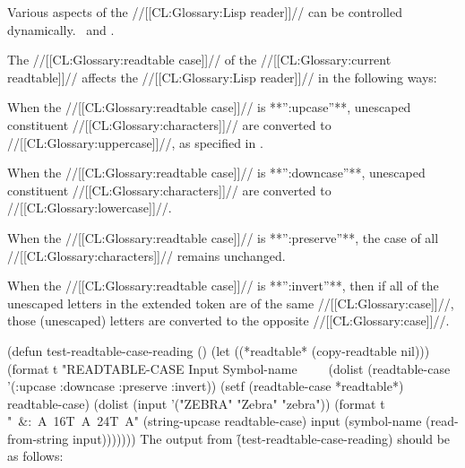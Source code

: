 


Various aspects of the //[[CL:Glossary:Lisp reader]]// can be controlled dynamically. \Seesection\Readtables\ and \secref\ReaderVars.

\endsubsection%
   

The //[[CL:Glossary:readtable case]]// of the //[[CL:Glossary:current readtable]]// affects the //[[CL:Glossary:Lisp reader]]// in the following ways:

\beginlist {}

 When the //[[CL:Glossary:readtable case]]// is **'':upcase''**,
 unescaped constituent //[[CL:Glossary:characters]]// are converted to //[[CL:Glossary:uppercase]]//,
 as specified in \secref\ReaderAlgorithm.


 When the //[[CL:Glossary:readtable case]]// is **'':downcase''**,
 unescaped constituent //[[CL:Glossary:characters]]// are converted to //[[CL:Glossary:lowercase]]//.


When the //[[CL:Glossary:readtable case]]// is **'':preserve''**,
 the case of all //[[CL:Glossary:characters]]// remains unchanged.


When the //[[CL:Glossary:readtable case]]// is **'':invert''**,
 then if all of the unescaped letters in the extended token are of the same //[[CL:Glossary:case]]//, 
 those (unescaped) letters are converted to the opposite //[[CL:Glossary:case]]//.

\endlist

 

\code
 (defun test-readtable-case-reading ()
   (let ((*readtable* (copy-readtable nil)))
     (format t "READTABLE-CASE  Input   Symbol-name~
              ~%
              ~%
     (dolist (readtable-case '(:upcase :downcase :preserve :invert))
       (setf (readtable-case *readtable*) readtable-case)
       (dolist (input '("ZEBRA" "Zebra" "zebra"))
         (format t "~&:~A~16T~A~24T~A"
                 (string-upcase readtable-case)
                 input
                 (symbol-name (read-from-string input))))))) \endcode
  The output from \f{(test-readtable-case-reading)} should be as follows:

